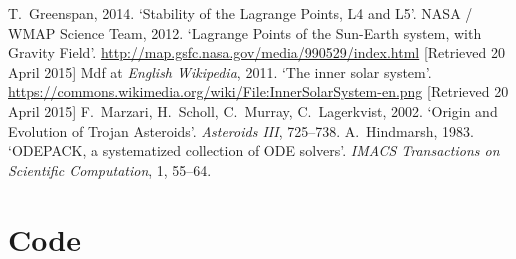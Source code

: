 \documentclass[a4paper]{article}
\begin{document}
  \clearpage
  \begin{thebibliography}{0}
      T.\ Greenspan, 2014. `Stability of the Lagrange Points, L4 and L5'.
      NASA / WMAP Science Team, 2012. `Lagrange Points of the Sun-Earth
      system, with Gravity Field'.
      \url{http://map.gsfc.nasa.gov/media/990529/index.html}
      [Retrieved 20 April 2015]
      Mdf at \textit{English Wikipedia}, 2011. `The inner solar system'.
      \url{https://commons.wikimedia.org/wiki/File:InnerSolarSystem-en.png}
      [Retrieved 20 April 2015]
      F.\ Marzari, H.\ Scholl, C.\ Murray, C.\ Lagerkvist, 2002.
      `Origin and Evolution of Trojan Asteroids'. \textit{Asteroids III},
      725--738.
      A.\ Hindmarsh, 1983. `ODEPACK, a systematized collection of ODE solvers'.
      \textit{IMACS Transactions on Scientific Computation}, 1, 55--64.
  \end{thebibliography}

  \appendix

  \section{Code}
    \label{app:code}
    \lstset{basicstyle=\small\ttfamily, numbers=left, numberstyle=\scriptsize,
    stepnumber=3}
    

    

    

    

    
\end{document}
